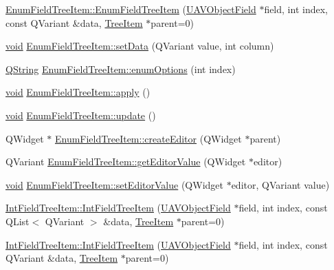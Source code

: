 \begin{DoxyCompactItemize}
\item 
\hyperlink{group___u_a_v_object_browser_plugin_ga15760edd8f3a9a12602e371c80ce41d7}{\-Enum\-Field\-Tree\-Item\-::\-Enum\-Field\-Tree\-Item} (\hyperlink{class_u_a_v_object_field}{\-U\-A\-V\-Object\-Field} $\ast$field, int index, const \-Q\-Variant \&data, \hyperlink{class_tree_item}{\-Tree\-Item} $\ast$parent=0)
\item 
\hyperlink{group___u_a_v_objects_plugin_ga444cf2ff3f0ecbe028adce838d373f5c}{void} \hyperlink{group___u_a_v_object_browser_plugin_ga9b505163cede21ebe793e4f55f238591}{\-Enum\-Field\-Tree\-Item\-::set\-Data} (\-Q\-Variant value, int column)
\item 
\hyperlink{group___u_a_v_objects_plugin_gab9d252f49c333c94a72f97ce3105a32d}{\-Q\-String} \hyperlink{group___u_a_v_object_browser_plugin_ga8e27834043bde7967a644fdb2b6157f8}{\-Enum\-Field\-Tree\-Item\-::enum\-Options} (int index)
\item 
\hyperlink{group___u_a_v_objects_plugin_ga444cf2ff3f0ecbe028adce838d373f5c}{void} \hyperlink{group___u_a_v_object_browser_plugin_ga28f3c98e391b2dc64c680f5f051b1c10}{\-Enum\-Field\-Tree\-Item\-::apply} ()
\item 
\hyperlink{group___u_a_v_objects_plugin_ga444cf2ff3f0ecbe028adce838d373f5c}{void} \hyperlink{group___u_a_v_object_browser_plugin_ga3eb923fde33bef4803a779dd493e2947}{\-Enum\-Field\-Tree\-Item\-::update} ()
\item 
\-Q\-Widget $\ast$ \hyperlink{group___u_a_v_object_browser_plugin_ga44f6457ccf2e1741aef853d851162981}{\-Enum\-Field\-Tree\-Item\-::create\-Editor} (\-Q\-Widget $\ast$parent)
\item 
\-Q\-Variant \hyperlink{group___u_a_v_object_browser_plugin_ga90464609dbac318a21de05cc0b906c6d}{\-Enum\-Field\-Tree\-Item\-::get\-Editor\-Value} (\-Q\-Widget $\ast$editor)
\item 
\hyperlink{group___u_a_v_objects_plugin_ga444cf2ff3f0ecbe028adce838d373f5c}{void} \hyperlink{group___u_a_v_object_browser_plugin_gaf34de2505125e49c75e2f4623cdaa726}{\-Enum\-Field\-Tree\-Item\-::set\-Editor\-Value} (\-Q\-Widget $\ast$editor, \-Q\-Variant value)
\item 
\hyperlink{group___u_a_v_object_browser_plugin_ga4ca34e25fd72802feaeb4123607bb7c4}{\-Int\-Field\-Tree\-Item\-::\-Int\-Field\-Tree\-Item} (\hyperlink{class_u_a_v_object_field}{\-U\-A\-V\-Object\-Field} $\ast$field, int index, const \-Q\-List$<$ \-Q\-Variant $>$ \&data, \hyperlink{class_tree_item}{\-Tree\-Item} $\ast$parent=0)
\item 
\hyperlink{group___u_a_v_object_browser_plugin_gab944da4a69d80c272ecb2cd56cb68a21}{\-Int\-Field\-Tree\-Item\-::\-Int\-Field\-Tree\-Item} (\hyperlink{class_u_a_v_object_field}{\-U\-A\-V\-Object\-Field} $\ast$field, int index, const \-Q\-Variant \&data, \hyperlink{class_tree_item}{\-Tree\-Item} $\ast$parent=0)

\end{DoxyCompactItemize}

